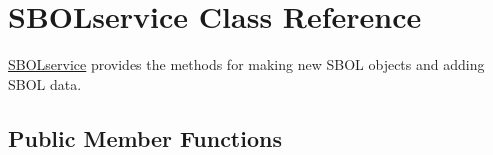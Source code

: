 \hypertarget{classorg_1_1sbolstandard_1_1lib_s_b_o_lj_1_1_s_b_o_lservice}{
\section{SBOLservice Class Reference}
\label{classorg_1_1sbolstandard_1_1lib_s_b_o_lj_1_1_s_b_o_lservice}
}


\hyperlink{classorg_1_1sbolstandard_1_1lib_s_b_o_lj_1_1_s_b_o_lservice}{SBOLservice} provides the methods for making new SBOL objects and adding SBOL data.  


\subsection*{Public Member Functions}
